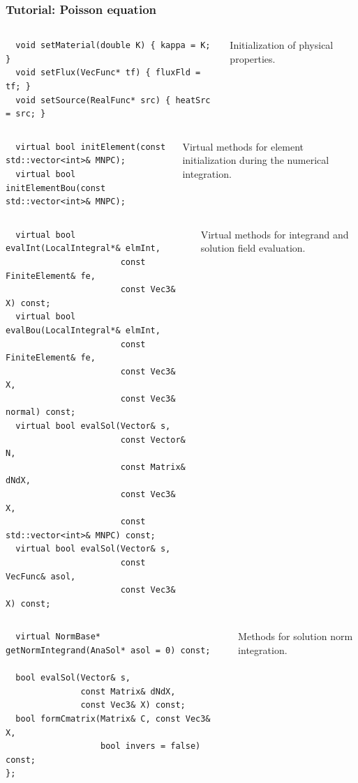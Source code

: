 \documentclass{beamer}
\begin{document}
\begin{frame}[fragile]
 \frametitle{Tutorial: Poisson equation}

 \begin{columns}[c]
  \tiny\begin{verbatim}
  void setMaterial(double K) { kappa = K; }
  void setFlux(VecFunc* tf) { fluxFld = tf; }
  void setSource(RealFunc* src) { heatSrc = src; }
  \end{verbatim}
   \small
  Initialization of physical properties.
 \end{columns}
 \pause
 \begin{columns}[c]
  \tiny\begin{verbatim}
  virtual bool initElement(const std::vector<int>& MNPC);
  virtual bool initElementBou(const std::vector<int>& MNPC);
  \end{verbatim}
   \small
  Virtual methods for element initialization during the numerical integration.
 \end{columns}
 \pause
 \begin{columns}[c]
  \tiny\begin{verbatim}
  virtual bool evalInt(LocalIntegral*& elmInt,
                       const FiniteElement& fe,
                       const Vec3& X) const;
  virtual bool evalBou(LocalIntegral*& elmInt,
                       const FiniteElement& fe,
                       const Vec3& X,
                       const Vec3& normal) const;
  virtual bool evalSol(Vector& s,
                       const Vector& N,
                       const Matrix& dNdX,
                       const Vec3& X,
                       const std::vector<int>& MNPC) const;
  virtual bool evalSol(Vector& s,
                       const VecFunc& asol,
                       const Vec3& X) const;
  \end{verbatim}
   \small
  Virtual methods for integrand and solution field evaluation.
 \end{columns}
 \pause
 \vskip-5mm
 \begin{columns}[c]
  \tiny\begin{verbatim}
  virtual NormBase* getNormIntegrand(AnaSol* asol = 0) const;

  bool evalSol(Vector& s,
               const Matrix& dNdX,
               const Vec3& X) const;
  bool formCmatrix(Matrix& C, const Vec3& X,
                   bool invers = false) const;
};
  \end{verbatim}
  \small
  Methods for solution norm integration.
 \end{columns}
\end{frame}
\end{document}
